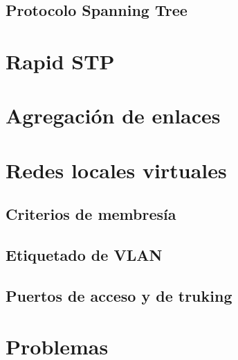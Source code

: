 \documentclass[
]{book}
\begin{document}
\hypertarget{protocolo-spanning-tree-1}{%
\subsection{Protocolo Spanning Tree}\label{protocolo-spanning-tree-1}}

\hypertarget{rapid-stp}{%
\section{Rapid STP}\label{rapid-stp}}

\hypertarget{agregaciuxf3n-de-enlaces}{%
\section{Agregación de enlaces}\label{agregaciuxf3n-de-enlaces}}

\hypertarget{redes-locales-virtuales}{%
\section{Redes locales virtuales}\label{redes-locales-virtuales}}

\hypertarget{criterios-de-membresuxeda}{%
\subsection{Criterios de membresía}\label{criterios-de-membresuxeda}}

\hypertarget{etiquetado-de-vlan}{%
\subsection{Etiquetado de VLAN}\label{etiquetado-de-vlan}}

\hypertarget{puertos-de-acceso-y-de-truking}{%
\subsection{Puertos de acceso y de truking}\label{puertos-de-acceso-y-de-truking}}

\hypertarget{problemas-2}{%
\section{Problemas}\label{problemas-2}}

  
\end{document}
